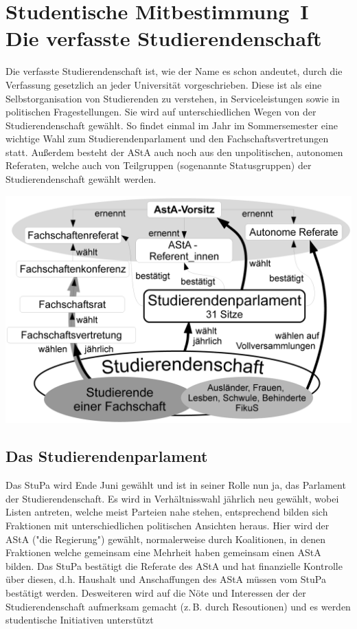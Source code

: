 \section[Studentische Mitbestimmung]{Studentische Mitbestimmung~I\\Die verfasste Studierendenschaft}
\label{studmit}
\begin{multicols*}{2}
Die verfasste Studierendenschaft ist, wie der Name es schon andeutet, durch die Verfassung gesetzlich an jeder Universität vorgeschrieben.
Diese ist als eine Selbstorganisation von Studierenden zu verstehen, in Serviceleistungen sowie in politischen Fragestellungen.
Sie wird auf unterschiedlichen Wegen von der Studierendenschaft gewählt.
So findet einmal im Jahr im Sommersemester eine wichtige Wahl zum Studierendenparlament und den Fachschaftsvertretungen statt.
Außerdem besteht der AStA auch noch aus den unpolitischen, autonomen Referaten, welche auch von Teilgruppen (sogenannte Statusgruppen) der Studierendenschaft gewählt werden.

\bigskip
\includegraphics[width=\columnwidth]{res/verfasste_studierendenschaft.png}
\bigskip

\subsection{Das Studierendenparlament}
Das StuPa wird Ende Juni gewählt und ist  in seiner Rolle nun ja, das Parlament der Studierendenschaft. Es wird in Verhältnisswahl jährlich neu gewählt, wobei Listen antreten, welche meist Parteien nahe stehen, entsprechend bilden sich Fraktionen mit unterschiedlichen politischen Ansichten heraus.
Hier wird der AStA ("die Regierung") gewählt, normalerweise durch Koalitionen, in denen Fraktionen welche gemeinsam eine Mehrheit haben gemeinsam einen AStA bilden. Das StuPa bestätigt die Referate des AStA und hat finanzielle Kontrolle über diesen, d.h. Haushalt und Anschaffungen des AStA müssen vom StuPa bestätigt werden. Desweiteren wird auf die Nöte und Interessen der der Studierendenschaft aufmerksam gemacht (z.\,B. durch Resoutionen) und es werden studentische Initiativen unterstützt


\end{multicols*}
